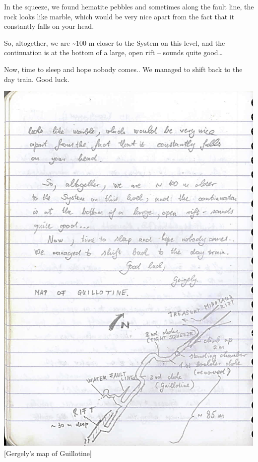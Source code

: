 In the squeeze, we found hematite pebbles and sometimes along the fault
line, the rock looks like marble, which would be very nice apart from
the fact that it constantly falls on your head.

So, altogether, we are \textasciitilde{}100 m closer to the System on
this level, and the continuation is at the bottom of a large, open rift
-- sounds quite good\ldots{}

Now, time to sleep and hope nobody comes.. We managed to shift back to
the day train. Good luck.

\includegraphics{UgLog1012/79.jpeg}\\
{[}Gergely's map of Guillotine{]}

